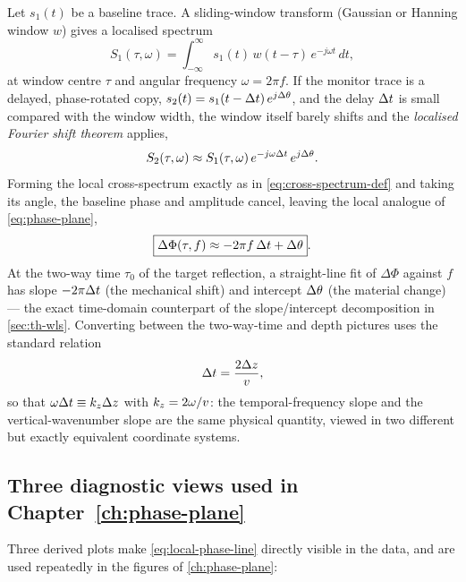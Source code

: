 Let $s_1(t)$ be a baseline trace. A sliding-window transform (Gaussian or
Hanning window $w$) gives a localised spectrum
\begin{equation}
  S_1(\tau,\omega) = \int_{-\infty}^{\infty} s_1(t)\,w(t-\tau)\,e^{-j\omega t}\,dt ,
  \label{eq:stft-def}
\end{equation}
at window centre $\tau$ and angular frequency $\omega=2\pi f$. If the monitor
trace is a delayed, phase-rotated copy, $s_2(t) = s_1(t-\Delta t)\,e^{j\Delta \theta}$,
and the delay $\Delta t$ is small compared with the window width, the window
itself barely shifts and the \emph{localised Fourier shift theorem} applies,
\begin{equation}
  S_2(\tau,\omega) \approx S_1(\tau,\omega)\, e^{-j\omega\Delta t}\, e^{j\Delta \theta} .
  \label{eq:local-shift}
\end{equation}
Forming the local cross-spectrum exactly as in \cref{eq:cross-spectrum-def}
and taking its angle, the baseline phase and amplitude cancel, leaving the
local analogue of \cref{eq:phase-plane},
\begin{equation}
  \boxed{\Delta\Phi(\tau,f) \approx -2\pi f\,\Delta t + \Delta \theta} .
  \label{eq:local-phase-line}
\end{equation}
At the two-way time $\tau_0$ of the target reflection, a straight-line fit of
$\Delta\Phi$ against $f$ has slope $-2\pi\Delta t$ (the mechanical shift) and
intercept $\Delta \theta$ (the material change) — the exact time-domain counterpart
of the slope/intercept decomposition in \cref{sec:th-wls}. Converting between
the two-way-time and depth pictures uses the standard relation
\begin{equation}
  \Delta t = \frac{2\Delta z}{v} ,
  \label{eq:dt-dz}
\end{equation}
so that $\omega\Delta t \equiv k_z\Delta z$ with $k_z = 2\omega/v$: the temporal-frequency
slope and the vertical-wavenumber slope are the same physical quantity, viewed
in two different but exactly equivalent coordinate systems.

\subsection{Three diagnostic views used in Chapter~\ref{ch:phase-plane}}

Three derived plots make \cref{eq:local-phase-line} directly visible in the
data, and are used repeatedly in the figures of \cref{ch:phase-plane}:

